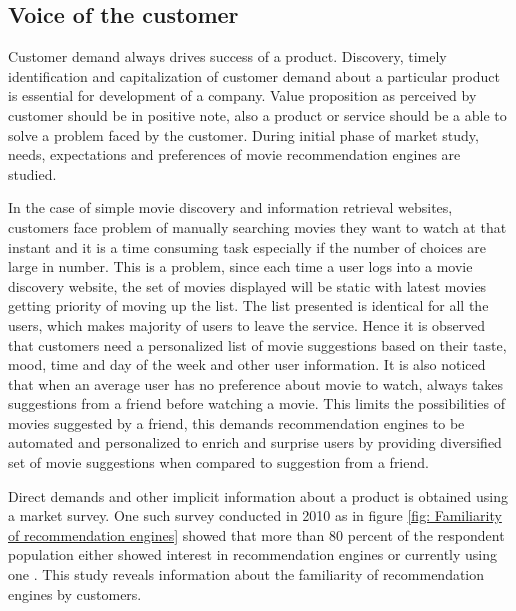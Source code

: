  \subsection{Voice of the customer}
 \label {Voice}
  Customer demand always drives success of a product. Discovery, timely identification and capitalization of customer demand about a particular product is essential for development of a company. Value proposition as perceived by customer should be in positive note, also a product or service should be a able to solve a problem faced by the customer. During initial phase of market study, needs, expectations and preferences of movie recommendation engines are studied.
  \par
  In the case of simple movie discovery and information retrieval websites, customers face problem of manually searching movies they want to watch at that instant and it is a time consuming task especially if the number of choices are large in number. This is a problem, since each time a user logs into a movie discovery website, the set of movies displayed will be static with latest movies getting priority of moving up the list. The list presented is identical for all the users, which makes majority of users to leave the service. Hence it is observed that customers need a personalized list of movie suggestions based on their taste, mood, time and day of the week and other user information. It is also noticed that when an average user has no preference about movie to watch, always takes suggestions from a friend before watching a movie. This limits the possibilities of movies suggested by a friend, this demands recommendation engines to be automated and personalized to enrich and surprise users by providing diversified set of movie suggestions when compared to suggestion from a friend.
  \par 
  Direct demands and other implicit information about a product is obtained using a market survey. One such survey conducted in 2010 as in figure \ref{fig: Familiarity of recommendation engines} showed that more than 80 percent of the respondent population either showed interest in recommendation engines or currently using one \citep{Recom8_voc}. This study reveals information about the familiarity of recommendation engines by customers. 
 
